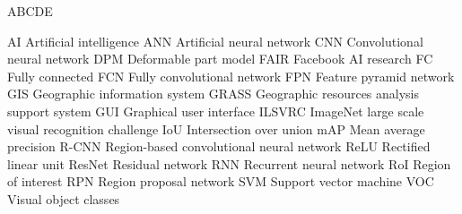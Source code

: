 
\begin{seznamzkratek}{ABCDE}

	      {AI}
	      {Artificial intelligence}
	      {ANN}
	      {Artificial neural network}
	      {CNN}
	      {Convolutional neural network}
	      {DPM}
	      {Deformable part model}
	      {FAIR}
	      {Facebook AI research}
	      {FC}
	      {Fully connected}
	      {FCN}
	      {Fully convolutional network}
	      {FPN}
	      {Feature pyramid network}
	      {GIS}
	      {Geographic information system}
	      {GRASS}
	      {Geographic resources analysis support system}
	      {GUI}
	      {Graphical user interface}
	      {ILSVRC}
	      {ImageNet large scale visual recognition challenge}
	      {IoU}
	      {Intersection over union}
	      {mAP}
	      {Mean average precision}
	      {R-CNN}
	      {Region-based convolutional neural network}
	      {ReLU}
	      {Rectified linear unit}
	      {ResNet}
	      {Residual network}
	      {RNN}
	      {Recurrent neural network}
	      {RoI}
	      {Region of interest}
	      {RPN}
	      {Region proposal network}
	      {SVM}
	      {Support vector machine}
	      {VOC}
	      {Visual object classes}
	      
\end{seznamzkratek}